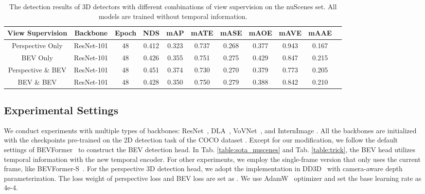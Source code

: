 \documentclass[10pt,twocolumn,letterpaper]{article}
\begin{document}
\begin{table*}[t]
    \caption{The detection results of 3D detectors with different combinations of view supervision on the nuScenes  set. All models are trained without temporal information.}
    \label{table:view_supervision}
    \centering

    \begin{tabular}{c|c|c|cc|cccccc}
        \toprule
        View Supervision & Backbone & Epoch & NDS & mAP & mATE & mASE & mAOE & mAVE & mAAE   \\ 
        \midrule 
        Perspective Only & ResNet-101 & 48 & 0.412 & 0.323 & 0.737 & 0.268 & 0.377 & 0.943 & 0.167 \\ 
        BEV Only & ResNet-101 & 48 & 0.426 & 0.355 & 0.751 & 0.275 & 0.429 & 0.847 & 0.215 \\ 
        Perspective \& BEV & ResNet-101 & 48 & 0.451 & 0.374 & 0.730 & 0.270 & 0.379 & 0.773 & 0.205 \\ 
        BEV \& BEV & ResNet-101 & 48 & 0.428 & 0.350 & 0.750 & 0.279 & 0.388 & 0.842 & 0.210 \\ 
        \midrule
        \bottomrule
    \end{tabular}
    
\end{table*} 
\subsection{Experimental Settings}
We conduct experiments with multiple types of backbones: ResNet~\cite{ResNet}, DLA~\cite{DLA}, VoVNet~\cite{Vovnet}, and InternImage \cite{InternImage}. 
All the backbones are initialized with the checkpoints pre-trained on the 2D detection task of the COCO dataset \cite{COCO}. 
Except for our modification, we follow the default settings of BEVFormer~\cite{bevformer} to construct the BEV detection head. 
In Tab. \ref{table:sota_nuscenes} and Tab. \ref{table:trick}, the BEV head utilizes temporal information with the new temporal encoder. For other experiments, we employ the single-frame version that only uses the current frame, like BEVFormer-S~\cite{bevformer}. 
For the perspective 3D detection head, we adopt the implementation in DD3D~\cite{DD3D} with camera-aware depth parameterization. 
The loss weight of perspective loss and BEV loss are set as . 
We use AdamW~\cite{AdamW} optimizer and set the base learning rate as 4e-4. 
\end{document}
